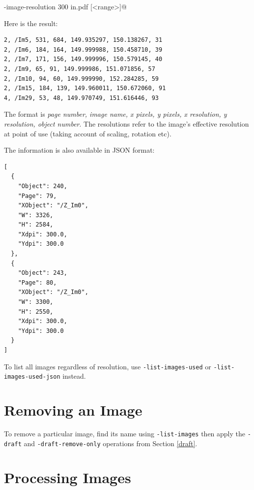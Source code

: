 \documentclass{book}
\begin{document}
  \begin{framed}
  \noindent\small\verb@cpdf -image-resolution 300 in.pdf [<range>]@
  \end{framed}

\noindent Here is the result:

\begin{framed}
{\small\begin{verbatim}2, /Im5, 531, 684, 149.935297, 150.138267, 31
2, /Im6, 184, 164, 149.999988, 150.458710, 39
2, /Im7, 171, 156, 149.999996, 150.579145, 40
2, /Im9, 65, 91, 149.999986, 151.071856, 57
2, /Im10, 94, 60, 149.999990, 152.284285, 59
2, /Im15, 184, 139, 149.960011, 150.672060, 91
4, /Im29, 53, 48, 149.970749, 151.616446, 93\end{verbatim}}
  \end{framed}

  \noindent The format is \textit{page number, image name, x pixels, y pixels, x resolution, y resolution, object number}. The resolutions refer to the image's effective resolution at point of use (taking account 
of scaling, rotation etc).

The information is also available in JSON format:

\begin{framed}
{\small\begin{verbatim}
[
  {
    "Object": 240,
    "Page": 79,
    "XObject": "/Z_Im0",
    "W": 3326,
    "H": 2584,
    "Xdpi": 300.0,
    "Ydpi": 300.0
  },
  {
    "Object": 243,
    "Page": 80,
    "XObject": "/Z_Im0",
    "W": 3300,
    "H": 2550,
    "Xdpi": 300.0,
    "Ydpi": 300.0
  }
]
\end{verbatim}}
  \end{framed}

\noindent To list all images regardless of resolution, use \texttt{-list-images-used} or \texttt{-list-images-used-json} instead.

\section{Removing an Image}

To remove a particular image, find its name using \texttt{-list-images} then apply the \texttt{-draft} and \texttt{-draft-remove-only} operations from Section \ref{draft}. 

\section{Processing Images}
\end{document}
